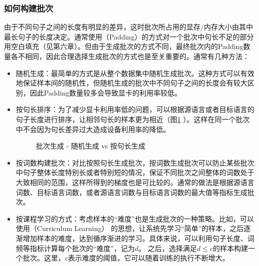 
\subsubsection{如何构建批次}

\parinterval 由于不同句子之间的长度有明显的差异，这时批次所占用的显存/内存大小由其中最长句子的长度决定。通常使用{\small{}}（Padding）的方式对一个批次中句长不足的部分用空白填充（见第六章）。但由于生成批次的方式不同，最终批次内的Padding数量各不相同，因此合理选择生成批次的方式也是至关重要的。通常有几种方法：

\begin{itemize}
\vspace{0.5em}
\item 随机生成：最简单的方式是从整个数据集中随机生成批次。这种方式可以有效地保证样本间的随机性，但随机生成的批次中不同句子之间的长度会有较大区别，因此Padding数量较多会导致显卡的利用率较低。
\vspace{0.5em}
\item 按句长排序：为了减少显卡利用率低的问题，可以根据源语言或者目标语言的句子长度进行排序，让相邻句长的样本更为相近（图\ref{fig:7-18} ）。这样在同一个批次中不会因为句长差异过大造成设备利用率的降低。

\begin{figure}[htp]
\centering

\caption{批次生成 - 随机生成 vs 按句长生成}
\label{fig:7-18}
\end{figure}

\vspace{0.5em}
\item 按词数构建批次：对比按照句长生成批次，按词数生成批次可以防止某些批次中句子整体长度特别长或者特别短的情况，保证不同批次之间整体的词数处于大致相同的范围，这样所得到的梯度也是可比较的。通常的做法是根据源语言词数、目标语言词数，或者源语言词数与目标语言词数的最大值等指标生成批次。

\vspace{0.5em}
\item 按课程学习的方式：考虑样本的``难度''也是生成批次的一种策略。比如，可以使用{\small{}}（Curriculum Learning） 的思想\cite{DBLP:conf/icml/BengioLCW09}，让系统先学习``简单''的样本，之后逐渐增加样本的难度，达到循序渐进的学习。具体来说，可以利用句子长度、词频等指标计算每个批次的``难度''，记为$d$。 之后，选择满足$d \leq c$的样本构建一个批次。这里，$c$表示难度的阈值，它可以随着训练的执行不断增大。
\vspace{0.5em}
\end{itemize}

